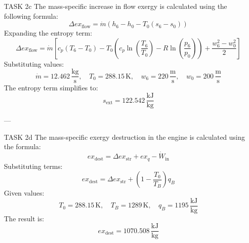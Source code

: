 TASK 2c  
The mass-specific increase in flow exergy is calculated using the following formula:  
\[
\Delta ex_{\text{flow}} = \dot{m} \left( h_6 - h_0 - T_0 \left( s_6 - s_0 \right) \right)
\]  
Expanding the entropy term:  
\[
\Delta ex_{\text{flow}} = \dot{m} \left[ c_p \left( T_6 - T_0 \right) - T_0 \left( c_p \ln \left( \frac{T_6}{T_0} \right) - R \ln \left( \frac{p_6}{p_0} \right) \right) + \frac{w_6^2 - w_0^2}{2} \right]
\]  
Substituting values:  
\[
\dot{m} = 12.462 \, \frac{\text{kg}}{\text{s}}, \quad T_0 = 288.15 \, \text{K}, \quad w_6 = 220 \, \frac{\text{m}}{\text{s}}, \quad w_0 = 200 \, \frac{\text{m}}{\text{s}}
\]  
The entropy term simplifies to:  
\[
s_{\text{ext}} = 122.542 \, \frac{\text{kJ}}{\text{kg}}
\]  

---

TASK 2d  
The mass-specific exergy destruction in the engine is calculated using the formula:  
\[
ex_{\text{dest}} = \Delta ex_{\text{str}} + ex_q - \dot{W}_{\text{in}}
\]  
Substituting terms:  
\[
ex_{\text{dest}} = \Delta ex_{\text{str}} + \left( 1 - \frac{T_0}{T_B} \right) q_B
\]  
Given values:  
\[
T_0 = 288.15 \, \text{K}, \quad T_B = 1289 \, \text{K}, \quad q_B = 1195 \, \frac{\text{kJ}}{\text{kg}}
\]  
The result is:  
\[
ex_{\text{dest}} = 1070.508 \, \frac{\text{kJ}}{\text{kg}}
\]